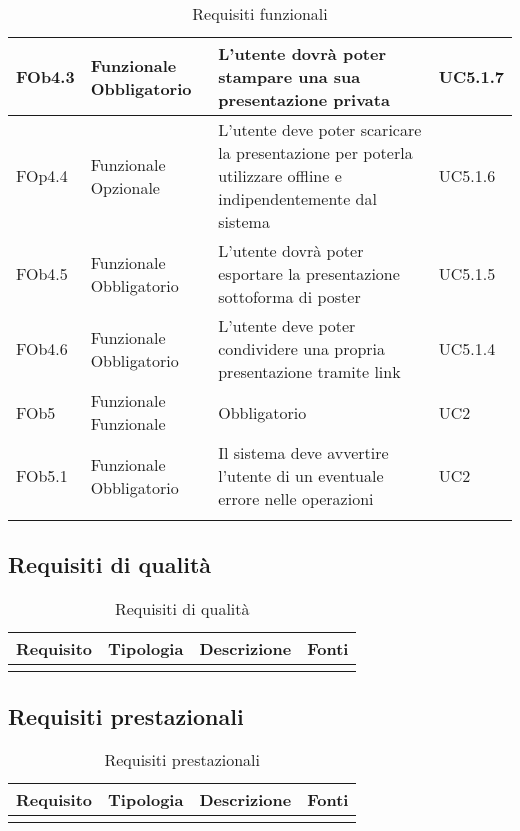 \begin{longtable}{|l|p{2.5cm}|p{2cm}|l|}
\hline
FOb4.3 & Funzionale \linebreak Obbligatorio & L'utente dovrà poter stampare una sua presentazione privata & UC5.1.7 \linebreak  \\
\hline
FOp4.4 & Funzionale \linebreak Opzionale & L'utente deve poter scaricare la presentazione per poterla utilizzare offline e indipendentemente dal sistema & UC5.1.6 \linebreak  \\
\hline
FOb4.5 & Funzionale \linebreak Obbligatorio & L'utente dovrà poter esportare la presentazione sottoforma di poster & UC5.1.5 \linebreak  \\
\hline
FOb4.6 & Funzionale \linebreak Obbligatorio & L'utente deve poter condividere una propria presentazione tramite link & UC5.1.4 \linebreak  \\
\hline
FOb5 & Funzionale \linebreak Funzionale & Obbligatorio & UC2 \linebreak \\
\hline
FOb5.1 & Funzionale \linebreak Obbligatorio & Il sistema deve avvertire l'utente di un eventuale errore nelle operazioni & UC2 \linebreak  \\
\hline
\caption{Requisiti funzionali}
\end{longtable}
\subsection{ Requisiti di qualità}
	
\begin{longtable}{|l|p{2.5cm}|p{3.5cm}|l|}
\hline
\textbf{Requisito} & \textbf{Tipologia} & \textbf{Descrizione} & \textbf{Fonti} \\
\hline
\caption{Requisiti di qualità}
\end{longtable}
\subsection{ Requisiti prestazionali}
	
\begin{longtable}{|l|p{2.5cm}|p{3.5cm}|l|}
\hline
\textbf{Requisito} & \textbf{Tipologia} & \textbf{Descrizione} & \textbf{Fonti} \\
\hline
\caption{Requisiti prestazionali}
\end{longtable}
